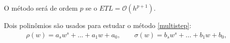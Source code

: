O método será de ordem $p$ se o $ETL=\mathcal O(h^{p+1})$.


Dois polinômios são usados para estudar o método \eqref{multistep}:
\begin{eqnarray}
\rho (w)= a_s w^s + ...+a_1w+a_0, \quad \quad \sigma (w)=b_s w^s + ...+b_1w+b_0,
\end{eqnarray}



%
%
%
%
%
%
%
%
%
%
%
%
%
%
%
%
%


